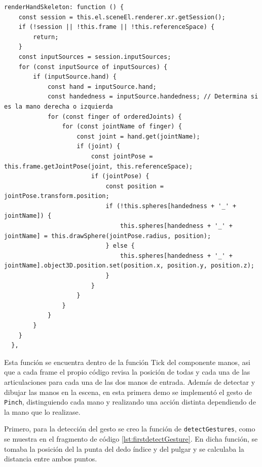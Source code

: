 \documentclass[a4paper, 12pt]{book}
\begin{document}
\begin{lstlisting}[caption=Dibujo de las manos en la escena, captionpos=b, label=lst:manos-codigo]
  renderHandSkeleton: function () {
    const session = this.el.sceneEl.renderer.xr.getSession();
    if (!session || !this.frame || !this.referenceSpace) {
        return;
    }
    const inputSources = session.inputSources;
    for (const inputSource of inputSources) {
        if (inputSource.hand) {
            const hand = inputSource.hand;
            const handedness = inputSource.handedness; // Determina si es la mano derecha o izquierda
            for (const finger of orderedJoints) {
                for (const jointName of finger) {
                    const joint = hand.get(jointName);
                    if (joint) {
                        const jointPose = this.frame.getJointPose(joint, this.referenceSpace);
                        if (jointPose) {
                            const position = jointPose.transform.position;
                            if (!this.spheres[handedness + '_' + jointName]) {
                                this.spheres[handedness + '_' + jointName] = this.drawSphere(jointPose.radius, position);
                            } else {
                                this.spheres[handedness + '_' + jointName].object3D.position.set(position.x, position.y, position.z);
                            }
                        }
                    }
                }
            }
        }
    }
  },
\end{lstlisting}

Esta función se encuentra dentro de la función Tick del componente manos, asi que a cada frame el propio código revisa la posición de todas y cada una de las articulaciones para cada una 
de las dos manos de entrada.
Además de detectar y dibujar las manos en la escena, en esta primera demo se implementó el gesto de \texttt{Pinch}, distinguiendo cada mano y realizando una acción distinta dependiendo de la mano que lo realizase. 

Primero, para la detección del gesto se creo la función de \texttt{detectGestures}, como se muestra en el fragmento de código \ref{lst:firstdetectGesture}. En dicha función, se tomaba la posición del la punta del dedo índice y del pulgar y se calculaba la distancia entre ambos puntos.
\end{document}
